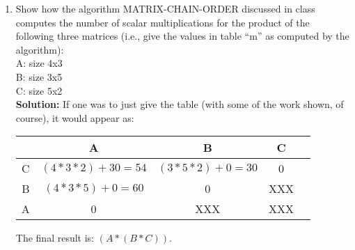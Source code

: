 \documentclass[11pts]{article}
\begin{document}
\begin{enumerate}
\begin{enumerate}
\begin{verbatim}
(Part D) The choices that lead to maximum revenue at week 4:
Week 1: Rest -> Week 2: High-Stress -> Week 3: Low-Stress -> Week 4: Low-Stress

  \end{verbatim} \\

  \end{enumerate}

\newpage
\item Show how the algorithm MATRIX-CHAIN-ORDER 
discussed in class computes the number of scalar multiplications for
the product of the 
following three matrices (i.e., give the values in table “m” as computed by the 
algorithm): \\
A: size 4x3 \\
B: size 3x5 \\
C: size 5x2 \\

  \textbf{Solution:} If one was to just give the table (with some of the
  work shown, of course), it would appear as: \\

    \begin{center}
    \begin{tabular}{| c || c | c | c | c |}
      \hline
        &          A                  &               B              &  C  \\
      \hline \hline
      C & $(4 * 3 * 2) + 30 = 54 $    &    $(3 * 5 * 2) + 0 = 30 $   &  0  \\
      \hline
      B & $(4 * 3 * 5) + 0 = 60 $     &            0                 & XXX \\
      \hline
      A &          0                  &            XXX               & XXX \\
      \hline
    \end{tabular}
    \end{center}

  The final result is: $(A * (B * C))$. \\


\end{enumerate}
\end{document}
